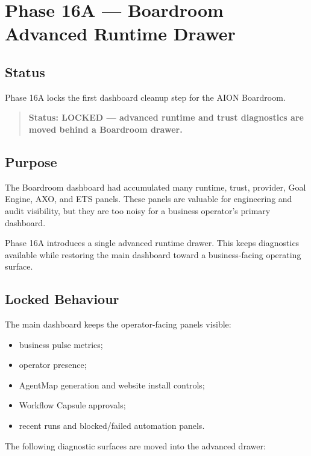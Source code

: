 \section{Phase 16A --- Boardroom Advanced Runtime Drawer}
\label{sec:phase16a-boardroom-advanced-runtime-drawer}

\subsection{Status}

Phase 16A locks the first dashboard cleanup step for the AION Boardroom.

\begin{quote}
\textbf{Status: LOCKED --- advanced runtime and trust diagnostics are moved behind a Boardroom drawer.}
\end{quote}

\subsection{Purpose}

The Boardroom dashboard had accumulated many runtime, trust, provider, Goal Engine, AXO, and ETS panels.
These panels are valuable for engineering and audit visibility, but they are too noisy for a business operator's primary dashboard.

Phase 16A introduces a single advanced runtime drawer. This keeps diagnostics available while restoring the main dashboard toward a business-facing operating surface.

\subsection{Locked Behaviour}

The main dashboard keeps the operator-facing panels visible:

\begin{itemize}
  \item business pulse metrics;
  \item operator presence;
  \item AgentMap generation and website install controls;
  \item Workflow Capsule approvals;
  \item recent runs and blocked/failed automation panels.
\end{itemize}

The following diagnostic surfaces are moved into the advanced drawer:

